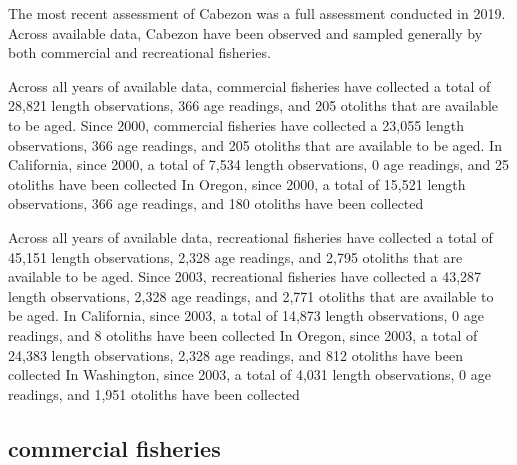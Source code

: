 \documentclass[11pt,
  english,
  letterpaper,
]{article}
\begin{document}
\leavevmode\tagmcend\tagstructend


The most recent assessment of Cabezon was a full assessment conducted in 2019. Across available data, Cabezon have been observed and sampled generally by both commercial and recreational fisheries.

\leavevmode\tagmcend\tagstructend\par


Across all years of available data, commercial fisheries have collected a total of 28,821 length observations, 366 age readings, and 205 otoliths that are available to be aged. Since 2000, commercial fisheries have collected a 23,055 length observations, 366 age readings, and 205 otoliths that are available to be aged. In California, since 2000, a total of 7,534 length observations, 0 age readings, and 25 otoliths have been collected In Oregon, since 2000, a total of 15,521 length observations, 366 age readings, and 180 otoliths have been collected

\leavevmode\tagmcend\tagstructend\par


Across all years of available data, recreational fisheries have collected a total of 45,151 length observations, 2,328 age readings, and 2,795 otoliths that are available to be aged. Since 2003, recreational fisheries have collected a 43,287 length observations, 2,328 age readings, and 2,771 otoliths that are available to be aged. In California, since 2003, a total of 14,873 length observations, 0 age readings, and 8 otoliths have been collected In Oregon, since 2003, a total of 24,383 length observations, 2,328 age readings, and 812 otoliths have been collected In Washington, since 2003, a total of 4,031 length observations, 0 age readings, and 1,951 otoliths have been collected

\leavevmode\tagmcend\tagstructend\par


\hypertarget{commercial-fisheries-9}{%
\subsection{commercial fisheries}\label{commercial-fisheries-9}}
\end{document}
